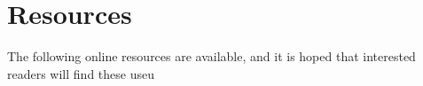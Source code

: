 \section{Resources}

The following online resources are available, and it is hoped that interested readers will find these useu